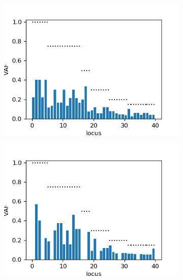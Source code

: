 \documentclass{article}
\begin{document}
\begin{figure}[h]
	\centering
	\begin{subfigure}[t]{0.30\linewidth}
		\centering
		\includegraphics[width = 1.0\linewidth, trim={0 0 20 20}, clip=true]{after_bylocus.png}
	\end{subfigure}%
	\hspace{0.02 \linewidth}
	\begin{subfigure}[t]{0.30\linewidth}
		\centering
		\includegraphics[width = 1.0\linewidth, trim={0 0 20 20}, clip=true]{minor_bylocus.png}
	\end{subfigure}%
	\hspace{0.02 \linewidth}

\end{figure}
\end{document}
